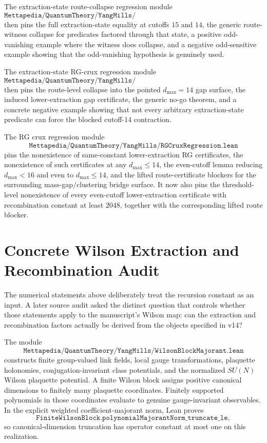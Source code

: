 \documentclass[11pt]{article}
\newcommand{\lean}[1]{\texttt{#1}}
\begin{document}
The extraction-state route-collapse regression module
\[
  \lean{Mettapedia/QuantumTheory/YangMills/ExtractionStateRouteCollapseRegression.lean}
\]
then pins the full extraction-state equality at cutoffs \(15\) and \(14\), the
generic route-witness collapse for predicates factored through that state, a
positive odd-vanishing example where the witness does collapse, and a negative
odd-sensitive example showing that the odd-vanishing hypothesis is genuinely
used.

The extraction-state RG-crux regression module
\[
  \lean{Mettapedia/QuantumTheory/YangMills/ExtractionStateRGCruxRegression.lean}
\]
then pins the route-level collapse into the pointed \(d_{\max}=14\) gap
surface, the induced lower-extraction gap certificate, the generic no-go
theorem, and a concrete negative example showing that not every arbitrary
extraction-state predicate can force the blocked cutoff-\(14\) contraction.

The RG crux regression module
\[
  \lean{Mettapedia/QuantumTheory/YangMills/RGCruxRegression.lean}
\]
pins the nonexistence of same-constant lower-extraction RG certificates, the
nonexistence of such certificates at any \(d_{\max}\le 14\), the even-cutoff
lemma reducing \(d_{\max}<16\) and even to \(d_{\max}\le14\), and the lifted
route-certificate blockers for the surrounding mass-gap/clustering bridge
surface.  It now also pins the threshold-level nonexistence of every
even-cutoff lower-extraction certificate with recombination constant at least
\(2048\), together with the corresponding lifted route blocker.

\section{Concrete Wilson Extraction and Recombination Audit}

The numerical statements above deliberately treat the recursion constant as an
input.  A later source audit asked the distinct question that controls whether
those statements apply to the manuscript's Wilson map: can the extraction and
recombination factors actually be derived from the objects specified in v14?

The module
\[
  \lean{Mettapedia/QuantumTheory/YangMills/WilsonBlockMajorant.lean}
\]
constructs finite group-valued link fields, local gauge transformations,
plaquette holonomies, conjugation-invariant class potentials, and the normalized
\(SU(N)\) Wilson plaquette potential.  A finite Wilson block assigns positive
canonical dimensions to finitely many plaquette coordinates.  Finitely
supported polynomials in those coordinates evaluate to genuine gauge-invariant
observables.  In the explicit weighted coefficient-majorant norm, Lean proves
\[
  \lean{FiniteWilsonBlock.polynomialMajorantNorm\_truncate\_le},
\]
so canonical-dimension truncation has operator constant at most one on this
realization.
\end{document}
